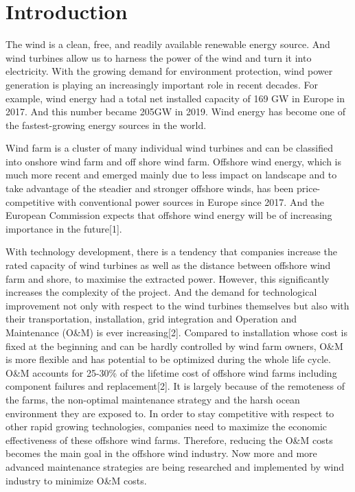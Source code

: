 \documentclass[english,a4paper,11pt]{article}
\begin{document}
\section{Introduction}
The wind is a clean, free, and readily available renewable energy source. And wind turbines allow us to harness the power of the wind and turn it into electricity. With the growing demand for environment protection, wind power generation is playing an increasingly important role in recent decades. For example, wind energy had a total net installed capacity of 169 GW in Europe in 2017. And this number became 205GW in 2019. Wind energy has become one of the fastest-growing energy sources in the world.

Wind farm is a cluster of many individual wind turbines and can be classified into onshore wind farm and off shore wind farm. Offshore wind energy, which is much more recent and emerged mainly due to less impact on landscape and to take advantage of the steadier and stronger offshore winds, has been price-competitive with conventional power sources in Europe since 2017. And the European Commission expects that offshore wind energy will be of increasing importance in the future[1].

With technology development, there is a tendency that companies increase the rated capacity of wind turbines as well as the distance between offshore wind farm and shore, to maximise the extracted power. However, this significantly increases the complexity of the project. And the demand for technological improvement not only with respect to the wind turbines themselves but also with their transportation, installation, grid integration and Operation and Maintenance (O\&M) is ever increasing[2]. Compared to installation whose cost is fixed at the beginning and can be hardly controlled by wind farm owners, O\&M is more flexible and has potential to be optimized during the whole life cycle. O\&M accounts for 25-30\% of the lifetime cost of offshore wind farms including component failures and replacement[2]. It is largely because of the remoteness of the farms, the non-optimal maintenance strategy and the harsh ocean environment they are exposed to. In order to stay competitive with respect to other rapid growing technologies, companies need to maximize the economic effectiveness of these offshore wind farms. Therefore, reducing the O\&M costs becomes the main goal in the offshore wind industry. Now more and more advanced maintenance strategies are being researched and implemented by wind industry to minimize O\&M costs.
\end{document}
